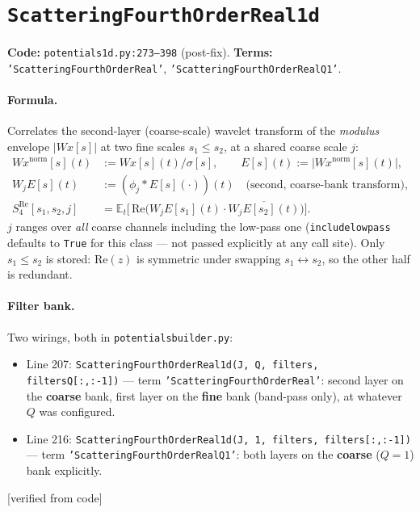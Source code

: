 \documentclass[11pt]{article}
\newcommand{\E}{\mathbb{E}}
\newcommand{\Wx}{W\!x}
\newcommand{\code}[1]{\texttt{#1}}
\renewcommand{\_}{\origunderscore\allowbreak} %
\newcommand{\verified}{\textcolor{blue!50!black}{[verified from code]}}
\begin{document}
\section{\code{Scattering\_Fourth\_Order\_Real\_1d}}
\label{sec:s4real}
\textbf{Code:} \code{potentials\_1d.py:273--398} (post-fix). \quad
\textbf{Terms:} \code{'Scattering\_Fourth\_Order\_Real'}, \code{'Scattering\_Fourth\_Order\_Real\_Q1'}.

\paragraph{Formula.} Correlates the second-layer (coarse-scale) wavelet
transform of the \emph{modulus} envelope $|\Wx[s]|$ at two fine scales
$s_1 \le s_2$, at a shared coarse scale $j$:
\begin{align}
  \Wx^{\text{norm}}[s](t) &:= \Wx[s](t)/\sigma[s], \qquad
  E[s](t) := |\Wx^{\text{norm}}[s](t)|, \\
  W_j E[s](t) &:= (\phi_j * E[s](\cdot))(t) \quad \text{(second, coarse-bank transform)}, \\
  S_4^{\text{Re}}[s_1,s_2,j] &= \E_t\Big[\,\mathrm{Re}\big(W_j E[s_1](t)\cdot \overline{W_j E[s_2](t)}\big)\Big].
\end{align}
$j$ ranges over \emph{all} coarse channels including the low-pass one
(\code{include\_lowpass} defaults to \code{True} for this class — not passed
explicitly at any call site). Only $s_1\le s_2$ is stored: $\mathrm{Re}(z)$ is
symmetric under swapping $s_1\!\leftrightarrow\!s_2$, so the other half is
redundant.

\paragraph{Filter bank.} Two wirings, both in \code{potentials\_builder.py}:
\begin{itemize}
  \item Line 207: \code{Scattering\_Fourth\_Order\_Real\_1d(J, Q, filters, filters\_Q[:,:-1])}
        — term \code{'Scattering\_Fourth\_Order\_Real'}: second layer on the
        \textbf{coarse} bank, first layer on the \textbf{fine} bank (band-pass
        only), at whatever $Q$ was configured.
  \item Line 216: \code{Scattering\_Fourth\_Order\_Real\_1d(J, 1, filters, filters[:,:-1])}
        — term \code{'Scattering\_Fourth\_Order\_Real\_Q1'}: both layers on the
        \textbf{coarse} ($Q=1$) bank explicitly.
\end{itemize}
\verified
\end{document}
